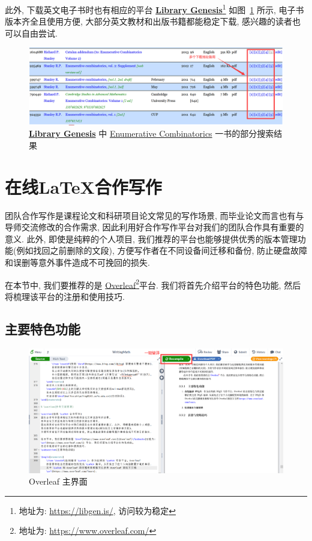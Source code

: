 \documentclass{formatBook}
\begin{document}
此外, 下载英文电子书时也有相应的平台 \textbf{\href{https://libgen.is/}{Library Genesis}}\footnote{地址为: \url{https://libgen.is/}, 访问较为稳定} 如图~\ref{fig:libgen} 所示, 电子书版本齐全且使用方便, 大部分英文教材和出版书籍都能稳定下载, 感兴趣的读者也可以自由尝试.
\begin{figure}[H]
    \centering
    \includegraphics[width=\textwidth]{figure/ec.png}
    \caption{\textbf{\href{https://libgen.is/}{Library Genesis}} 中 \href{https://libgen.is/search.php?&req=Enumerative+Combinatorics&phrase=1&view=simple&column=def&sort=year&sortmode=DESC}{Enumerative Combinatorics} 一书的部分搜索结果}
    \label{fig:libgen}
\end{figure}

\section{在线\LaTeX 合作写作}
团队合作写作是课程论文和科研项目论文常见的写作场景, 而毕业论文而言也有与导师交流修改的合作需求, 因此利用好合作写作平台对我们的团队合作具有重要的意义. 此外, 即使是纯粹的个人项目, 我们推荐的平台也能够提供优秀的版本管理功能(例如找回之前删除的文段), 方便写作者在不同设备间迁移和备份, 防止硬盘故障和误删等意外事件造成不可挽回的损失.

在本节中, 我们要推荐的是 \href{https://www.overleaf.com/}{Overleaf}\footnote{地址为: \url{https://www.overleaf.com/}}平台. 我们将首先介绍平台的特色功能, 然后将梳理该平台的注册和使用技巧.

\subsection{主要特色功能}
\begin{figure}[H]
    \centering
    \includegraphics[width=\textwidth]{figure/overleafMain.png}
    \caption{Overleaf 主界面}
    \label{fig:overleafMain}
\end{figure}
\end{document}
